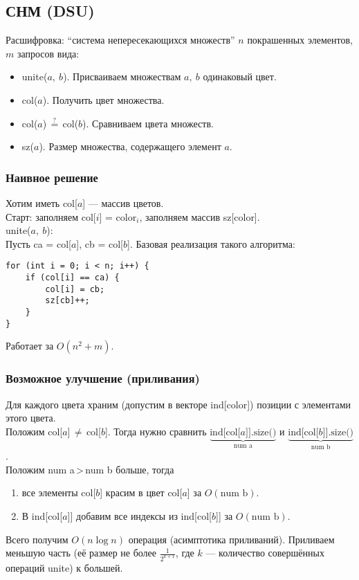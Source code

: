 \documentclass[12pt, a4paper]{article}
\begin{document}
    \subsection{СНМ (DSU)}
    Расшифровка: ``система непересекающихся множеств''
    $n$ покрашенных элементов, $m$ запросов вида:
    \begin{itemize}
        \item unite($a,\ b$). Присваиваем множествам $a,\ b$ одинаковый цвет.
        \item col($a$). Получить цвет множества.
        \item col($a$)\,$\overset{?}{=}$\,col($b$). Сравниваем цвета множеств.
        \item sz($a$). Размер множества, содержащего элемент $a$.
    \end{itemize}
    \subsubsection*{Наивное решение}
    Хотим иметь col[$a$] --- массив цветов.\\
    Старт: заполняем col[$i$] = color$_i$, заполняем массив sz[color].\\
    unite($a,\ b$):\\
    Пусть ca = col[$a$], cb = col[$b$]. Базовая реализация такого алгоритма:
    \begin{lstlisting}
for (int i = 0; i < n; i++) {
    if (col[i] == ca) {
        col[i] = cb;
        sz[cb]++;
    }
}
    \end{lstlisting}
    Работает за $O(n^2 + m)$.\\
    \subsubsection*{Возможное улучшение (приливания)}
    Для каждого цвета храним (допустим в векторе ind[color]) позиции с элементами этого цвета.\\
    Положим col[$a$]\,$\neq$\,col[$b$]. Тогда нужно сравнить $\underset{\text{num a}}{\underbrace{\text{ind[col[$a$]].size()}}}$ и $\underset{\text{num b}}{\underbrace{\text{ind[col[$b$]].size()}}}$.\\
    Положим num a\,>\,num b больше, тогда 
    \begin{enumerate}
        \item все элементы col[$b$] красим в цвет col[$a$] за $O(\text{num b})$.
        \item В ind[col[$a$]] добавим все индексы из ind[col[$b$]] за $O(\text{num b})$.
    \end{enumerate}
    Всего получим $O(n\log n)$ операция (асимптотика приливаний). Приливаем меньшую часть (её размер не более $\frac{1}{2^{k + 1}}$, где $k$ --- количество совершённых операций unite) к большей.
\end{document}
